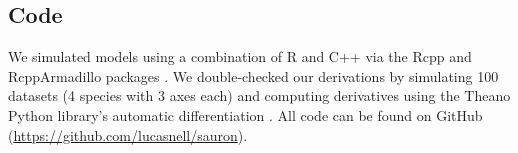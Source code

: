 




\subsection*{Code}

We simulated models using a combination of R \citep{RCoreTeam2020} and
C++ via the Rcpp and RcppArmadillo packages
\citep{Eddelbuettel2014a,Eddelbuettel2013a,Sanderson2016}.
We double-checked our derivations by simulating 100 datasets
(4 species with 3 axes each) and computing derivatives using the Theano Python
library's automatic differentiation \citep{TheanoTeam2016a}.
All code can be found on GitHub
(\url{https://github.com/lucasnell/sauron}).

